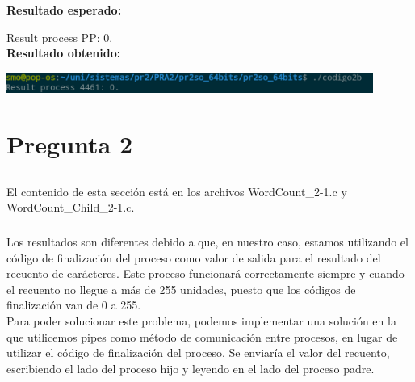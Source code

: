 \documentclass[spanish]{article}
\begin{document}
\textbf{Resultado esperado:}

Result process PP: 0.\\

\textbf{Resultado obtenido:}

\begin{center}
\includegraphics[width=12cm]{../img/4.png}
\end{center}

\section{Pregunta 2}

\subsection{}

\subsubsection{}

El contenido de esta sección está en los archivos
WordCount\_2-1.c y WordCount\_Child\_2-1.c.

\subsubsection{}

Los resultados son diferentes debido a que, en nuestro caso,
estamos utilizando el código de finalización del proceso
como valor de salida para el resultado del recuento de
carácteres. Este proceso funcionará correctamente siempre y
cuando el recuento no llegue a más de 255 unidades, puesto
que los códigos de finalización van de 0 a 255.\\

Para poder solucionar este problema, podemos implementar una
solución en la que utilicemos pipes como método de
comunicación entre procesos, en lugar de utilizar el código
de finalización del proceso. Se enviaría el valor del
recuento, escribiendo el lado del proceso hijo y leyendo en
el lado del proceso padre.

\subsection{}

\subsection{}

\subsection{}


\newpage

\begin{thebibliography}{X}

\end{thebibliography}
\end{document}

